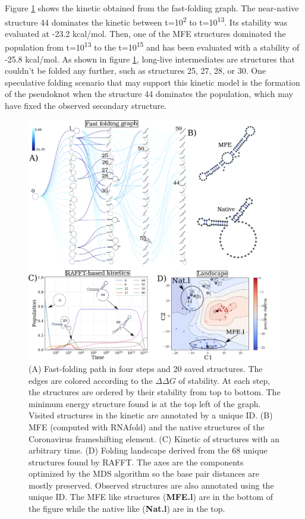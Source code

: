 \documentclass[a4paper,12pt]{article}
\begin{document}
Figure \ref{test_case} shows the kinetic obtained from the fast-folding graph. The
near-native structure 44 dominates the kinetic between t=10\textsuperscript{2} to t=10\textsuperscript{13}. Its
stability was evaluated at -23.2 kcal/mol. Then, one of the MFE structures
dominated the population from t=10\textsuperscript{13} to the t=10\textsuperscript{15} and has been evaluated with
a stability of -25.8 kcal/mol. As shown in figure \ref{test_case}, long-live
intermediates are structures that couldn't be folded any further, such as
structures 25, 27, 28, or 30. One speculative folding scenario that may support
this kinetic model is the formation of the pseudoknot when the structure 44
dominates the population, which may have fixed the observed secondary structure.

\begin{figure}[htbp]
\centering
\includegraphics[width=.9\linewidth]{img/test_case.png}
\caption{\label{test_case}(A) Fast-folding path in four steps and 20 saved structures. The edges are colored according to the \(\Delta \Delta G\) of stability. At each step, the structures are ordered by their stability from top to bottom. The minimum energy structure found is at the top left of the graph. Visited structures in the kinetic are annotated by a unique ID. (B) MFE (computed with RNAfold) and the native structures of the Coronavirus frameshifting element. (C) Kinetic of structures with an arbitrary time. (D) Folding landscape derived from the 68 unique structures found by RAFFT. The axes are the components optimized by the MDS algorithm so the base pair distances are mostly preserved. Observed structures are also annotated using the unique ID. The MFE like structures (\textbf{MFE.l}) are in the bottom of the figure while the native like (\textbf{Nat.l}) are in the top.}
\end{figure}
\end{document}
